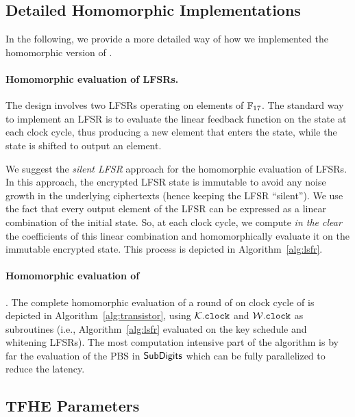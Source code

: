 	
\subsection{Detailed Homomorphic Implementations}
\label{sec:detailed_implementation}

In the following, we provide a more detailed way of how we implemented the homomorphic version of \coolName.

\paragraph{Homomorphic evaluation of LFSRs.}
The \coolName design involves two LFSRs operating on elements of $\mathbb{F}_{17}$. The standard way to implement an LFSR is to evaluate the linear feedback function on the state at each clock cycle, thus producing a new element that enters the state, while the state is shifted to output an element. 

We suggest the \emph{silent LFSR} approach for the homomorphic evaluation of LFSRs. In this approach, the encrypted LFSR state is immutable to avoid any noise growth in the underlying ciphertexts (hence keeping the LFSR ``silent''). We use the fact that every output element of the LFSR can be expressed as a linear combination of the initial state. So, at each clock cycle, we compute \emph{in the clear} the coefficients of this linear combination and homomorphically evaluate it on the immutable encrypted state. This process is depicted in Algorithm~\ref{alg:lsfr}.





\paragraph{Homomorphic evaluation of} \coolName. The complete homomorphic evaluation of a round of on clock cycle of \coolName is depicted in Algorithm~\ref{alg:transistor}, using $\mathcal{K}.\texttt{clock}$ and $\mathcal{W}.\texttt{clock}$ as subroutines (i.e., Algorithm~\ref{alg:lsfr} evaluated on the key schedule and whitening LFSRs). The most computation intensive part of the algorithm is by far the evaluation of the PBS in $\text{\textsf{SubDigits}}$ which can be fully parallelized to reduce the latency.


 




\subsection{TFHE Parameters} 
\label{sec:tfhe-parameters}

